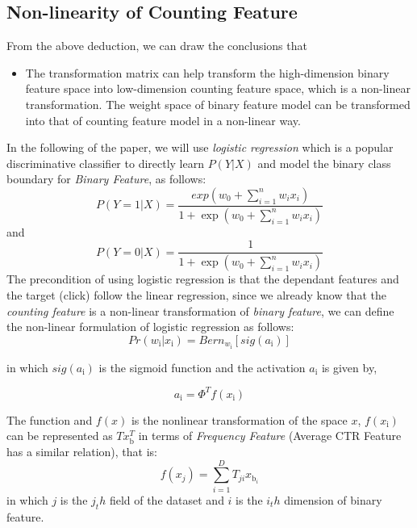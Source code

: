 \subsection{Non-linearity of Counting Feature}
From the above deduction, we can draw the conclusions that
\begin{itemize}
\item The transformation matrix can help transform the high-dimension binary feature space into low-dimension counting feature space, which is a non-linear transformation.
\imte The weight space of binary feature model can be transformed into that of counting feature model in a non-linear way.
\end{itemize}
In the following of the paper, we will use \textit{logistic regression} which is a popular discriminative classifier to directly learn \(P(Y|X)\) and model the binary class boundary for \textit{Binary Feature}, as follows:
\begin{equation}
P(Y = 1| X) = \frac{exp(w_{0} + \sum_{i = 1}^{n} w_{i}x_{i})}{1 + \exp(w_{0} + \sum_{i = 1}^{n} w_{i}x_{i})}  
\end{equation}
and 
\begin{equation}
P(Y = 0| X) = \frac{1}{1 + \exp(w_{0} + \sum_{i = 1}^{n} w_{i}x_{i})}  
\end{equation}
The precondition of using logistic regression is that the dependant features and the target (click) follow the linear regression, since we already know that the \textit{counting feature} is a non-linear transformation of \textit{binary feature}, we can define the non-linear formulation of logistic regression as follows:
\begin{equation}
Pr(w_{\text{i}}|x_{\text{i}}) = Bern_{w_{\text{i}}}[sig(a_{\text{i}})]
\end{equation} \cite{prince2012computer}

in which \(sig(a_{\text{i}})\) is the sigmoid function and the activation \(a_{\text{i}}\) is given by,

\begin{equation}
a_{\text{i}} = \Phi^T f(x_{\text{i}})
\end{equation}

The function and \(f(x)\) is the nonlinear transformation of the space \(x\), \(f(x_{\text{i}})\) can be represented as \(T x_{\text{b}}^T \) in terms of \textit{Frequency Feature} (Average CTR Feature has a similar relation), that is:
\begin{equation}
f(x_j) = \sum_{i=1}^{D}T_{ji} x_\text{b}_i  
\end{equation}
in which \(j\) is the \(j_th\) field of the dataset and \(i\) is the \(i_th\) dimension of binary feature. 

